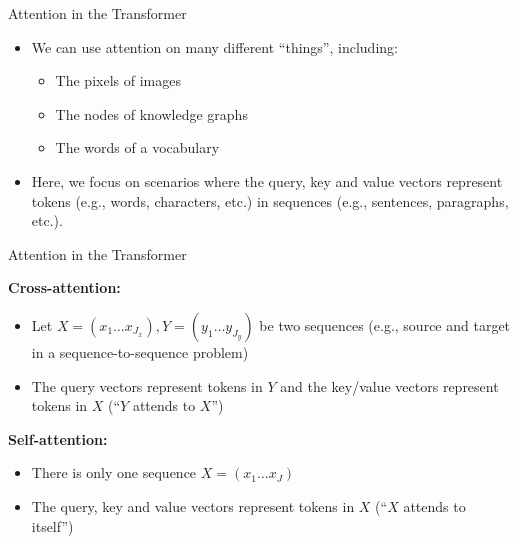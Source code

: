 
\begin{vbframe}{Attention in the Transformer}

\vfill

\begin{itemize}
\item We can use attention on many different ``things'', including: 
\begin{itemize}
\item The pixels of images
\item The nodes of knowledge graphs
\item The words of a vocabulary
\end{itemize}
\item Here, we focus on scenarios where the query, key and value vectors represent tokens (e.g., words, characters, etc.) in sequences (e.g., sentences, paragraphs, etc.).
\end{itemize}

\vfill

\end{vbframe}


\begin{vbframe}{Attention in the Transformer}

\vfill

\textbf{Cross-attention:}
\begin{itemize}
\item Let $X = (x_1 \ldots x_{J_x}), Y = (y_1 \ldots y_{J_y})$ be two sequences (e.g., source and target in a sequence-to-sequence problem)
\item The query vectors represent tokens in $Y$ and the key/value vectors represent tokens in $X$ (``$Y$ attends to $X$'')
\end{itemize}
\textbf{Self-attention:}
\begin{itemize}
\item There is only one sequence $X = (x_1 \ldots x_J)$
\item The query, key and value vectors represent tokens in $X$ (``$X$ attends to itself'')
\end{itemize}

\vfill

\end{vbframe}


